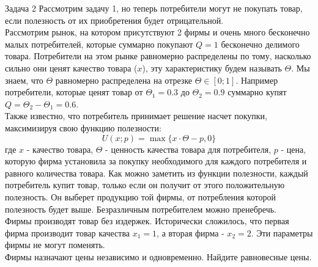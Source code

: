 \begin{mybox}{Задача 2}
    \indent\setlength{\parindent}{1em}\indent\setlength{\parindent}{1em}Рассмотрим задачу 1, но
    теперь потребители могут не покупать товар, если полезность от их приобретения будет отрицательной.\\
    \indent\setlength{\parindent}{1em}Рассмотрим рынок, на котором присутствуют 2
    фирмы и очень много бесконечно малых потребителей, которые суммарно покупают $Q=1$
    бесконечно делимого товара. Потребители на этом рынке равномерно распределены по тому, насколько сильно они ценят
    качество товара ($x$), эту характеристику будем называть $\Theta$. Мы знаем, что $\Theta$ равномерно
    распределена на отрезке $\Theta\in [0;1]$. Например потребители, которые ценят товар от $\Theta_1=0.3$ до
    $\Theta_2=0.9$ суммарно купят $Q=\Theta_2-\Theta_1=0.6$.\\
    \indent\setlength{\parindent}{1em}Также известно, что потребитель принимает решение насчет покупки, максимизируя
    свою функцию полезности:
    $$U(x;p)=\max\{x\cdot\Theta-p,0\}$$
    где $x$ - качество товара, $\Theta$ - ценность качества товара для потребителя, $p$ - цена, которую фирма
    установила за покупку необходимого для каждого потребителя и равного количества товара. Как можно заметить из
    функции полезности, каждый потребитель купит товар, только если он получит от этого положительную полезность. Он
    выберет продукцию той фирмы, от потребления которой полезность будет выше. Безразличным потребителем можно пренебречь.\\
    \indent\setlength{\parindent}{1em}Фирмы производят товар без издержек. Исторически сложилось, что первая фирма
    производит товар качества $x_1=1$, а вторая фирма - $x_2=2$. Эти параметры фирмы не могут поменять.\\
    \indent\setlength{\parindent}{1em}Фирмы назначают цены независимо и одновременно. Найдите равновесные цены.
\end{mybox}

